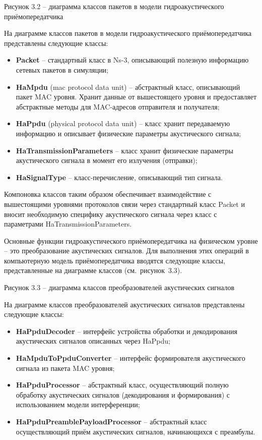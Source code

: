 Рисунок 3.2 -- диаграмма классов пакетов в модели гидроакустического
приёмопередатчика

На диаграмме классов пакетов в модели гидроакустического
приёмопередатчика представлены следующие классы:

\begin{itemize}
\item
  \textbf{Packet} -- стандартный класс в Ns-3, описывающий полезную
  информацию сетевых пакетов в симуляции;
\item
  \textbf{HaMpdu} (mac protocol data unit) -- абстрактный класс,
  описывающий пакет MAC уровня. Хранит данные от вышестоящего уровня и
  предоставляет абстрактные методы для MAC-адресов отправителя и
  получателя;
\item
  \textbf{HaPpdu} (physical protocol data unit) -- класс хранит
  передаваемую информацию и описывает физические параметры акустического
  сигнала;
\item
  \textbf{HaTransmissionParameters} -- класс хранит физические параметры
  акустического сигнала в момент его излучения (отправки);
\item
  \textbf{HaSignalType} -- класс-перечисление, описывающий тип сигнала.
\end{itemize}

Компоновка классов таким образом обеспечивает взаимодействие с
вышестоящими уровнями протоколов связи через стандартный класс Packet и
вносит необходимую специфику акустического сигнала через класс с
параметрами HaTransmissionParameters.

Основные функции гидроакустического приёмопередатчика на физическом
уровне -- это преобразование акустических сигналов. Для выполнения этих
операций в компьютерную модель приёмопередатчика вводятся следующие
классы, представленные на диаграмме классов (см.~рисунок~3.3).

Рисунок 3.3 -- диаграмма классов преобразователей акустических сигналов

На диаграмме классов преобразователей акустических сигналов представлены
следующие классы:

\begin{itemize}
\item
  \textbf{HaPpduDecoder} -- интерфейс устройства обработки и
  декодирования акустических сигналов описанных через HaPpdu;
\item
  \textbf{HaMpduToPpduConverter} -- интерфейс формирователя
  акустического сигнала из пакета MAC уровня;
\item
  \textbf{HaPpduProcessor} -- абстрактный класс, осуществляющий полную
  обработку акустических сигналов (декодирования и формирования) с
  использованием модели интерференции;
\item
  \textbf{HaPpduPreamblePayloadProcessor} -- абстрактный класс
  осуществляющий приём акустических сигналов, начинающихся с преамбулы.
\end{itemize}

